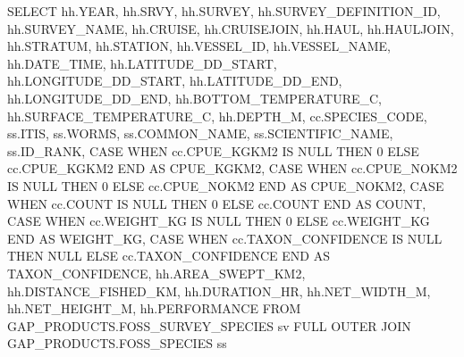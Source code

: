 \documentclass[
  letterpaper,
  oneside,
  open=any]{scrbook}
\newenvironment{Shaded}{\begin{snugshade}}{\end{snugshade}}
\newcommand{\ControlFlowTok}[1]{\textcolor[rgb]{0.00,0.23,0.31}{#1}}
\newcommand{\DataTypeTok}[1]{\textcolor[rgb]{0.68,0.00,0.00}{#1}}
\newcommand{\DecValTok}[1]{\textcolor[rgb]{0.68,0.00,0.00}{#1}}
\newcommand{\FunctionTok}[1]{\textcolor[rgb]{0.28,0.35,0.67}{#1}}
\newcommand{\KeywordTok}[1]{\textcolor[rgb]{0.00,0.23,0.31}{#1}}
\newcommand{\NormalTok}[1]{\textcolor[rgb]{0.00,0.23,0.31}{#1}}
\begin{document}
\begin{Shaded}
\begin{Highlighting}[]

\KeywordTok{SELECT} 
\NormalTok{hh.}\DataTypeTok{YEAR}\NormalTok{,}
\NormalTok{hh.SRVY,                 }
\NormalTok{hh.SURVEY,}
\NormalTok{hh.SURVEY\_DEFINITION\_ID,}
\NormalTok{hh.SURVEY\_NAME,}
\NormalTok{hh.CRUISE,}
\NormalTok{hh.CRUISEJOIN,           }
\NormalTok{hh.HAUL,}
\NormalTok{hh.HAULJOIN,}
\NormalTok{hh.STRATUM,}
\NormalTok{hh.STATION,}
\NormalTok{hh.VESSEL\_ID,}
\NormalTok{hh.VESSEL\_NAME,          }
\NormalTok{hh.DATE\_TIME,}
\NormalTok{hh.LATITUDE\_DD\_START, }
\NormalTok{hh.LONGITUDE\_DD\_START, }
\NormalTok{hh.LATITUDE\_DD\_END,}
\NormalTok{hh.LONGITUDE\_DD\_END, }
\NormalTok{hh.BOTTOM\_TEMPERATURE\_C,}
\NormalTok{hh.SURFACE\_TEMPERATURE\_C,}
\NormalTok{hh.DEPTH\_M,}
\NormalTok{cc.SPECIES\_CODE,}
\NormalTok{ss.ITIS,}
\NormalTok{ss.WORMS,}
\NormalTok{ss.COMMON\_NAME,     }
\NormalTok{ss.SCIENTIFIC\_NAME,}
\NormalTok{ss.ID\_RANK,}
\ControlFlowTok{CASE} \ControlFlowTok{WHEN}\NormalTok{ cc.CPUE\_KGKM2 }\KeywordTok{IS} \KeywordTok{NULL} \ControlFlowTok{THEN} \DecValTok{0} \ControlFlowTok{ELSE}\NormalTok{ cc.CPUE\_KGKM2 }\ControlFlowTok{END} \KeywordTok{AS}\NormalTok{ CPUE\_KGKM2,}
\ControlFlowTok{CASE} \ControlFlowTok{WHEN}\NormalTok{ cc.CPUE\_NOKM2 }\KeywordTok{IS} \KeywordTok{NULL} \ControlFlowTok{THEN} \DecValTok{0} \ControlFlowTok{ELSE}\NormalTok{ cc.CPUE\_NOKM2 }\ControlFlowTok{END} \KeywordTok{AS}\NormalTok{ CPUE\_NOKM2,}
\ControlFlowTok{CASE} \ControlFlowTok{WHEN}\NormalTok{ cc.}\FunctionTok{COUNT} \KeywordTok{IS} \KeywordTok{NULL} \ControlFlowTok{THEN} \DecValTok{0} \ControlFlowTok{ELSE}\NormalTok{ cc.}\FunctionTok{COUNT} \ControlFlowTok{END} \KeywordTok{AS} \FunctionTok{COUNT}\NormalTok{,}
\ControlFlowTok{CASE} \ControlFlowTok{WHEN}\NormalTok{ cc.WEIGHT\_KG }\KeywordTok{IS} \KeywordTok{NULL} \ControlFlowTok{THEN} \DecValTok{0} \ControlFlowTok{ELSE}\NormalTok{ cc.WEIGHT\_KG }\ControlFlowTok{END} \KeywordTok{AS}\NormalTok{ WEIGHT\_KG,}
\ControlFlowTok{CASE} \ControlFlowTok{WHEN}\NormalTok{ cc.TAXON\_CONFIDENCE }\KeywordTok{IS} \KeywordTok{NULL} \ControlFlowTok{THEN} \KeywordTok{NULL} \ControlFlowTok{ELSE}\NormalTok{ cc.TAXON\_CONFIDENCE }\ControlFlowTok{END} \KeywordTok{AS}\NormalTok{ TAXON\_CONFIDENCE,}
\NormalTok{hh.AREA\_SWEPT\_KM2,       }
\NormalTok{hh.DISTANCE\_FISHED\_KM,}
\NormalTok{hh.DURATION\_HR,          }
\NormalTok{hh.NET\_WIDTH\_M,}
\NormalTok{hh.NET\_HEIGHT\_M,}
\NormalTok{hh.PERFORMANCE }
\KeywordTok{FROM}\NormalTok{ GAP\_PRODUCTS.FOSS\_SURVEY\_SPECIES sv}
\KeywordTok{FULL} \KeywordTok{OUTER} \KeywordTok{JOIN}\NormalTok{ GAP\_PRODUCTS.FOSS\_SPECIES ss}

\end{Highlighting}
\end{Shaded}
\end{document}
